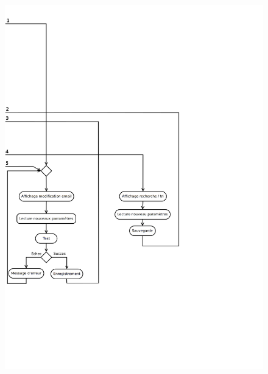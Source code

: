 \begin{figure}[h!]
\begin{center}
\includegraphics[width=16cm]{uml/appli_pc/p2.png}
\end{center}
\end{figure}
\newpage{}

